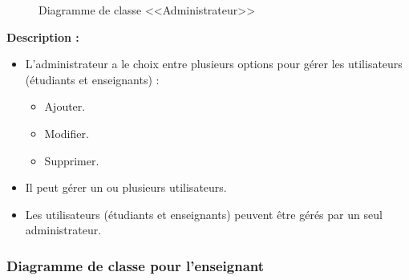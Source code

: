 \documentclass[12pt]{report}
\begin{document}
\begin{figure}[h]
\centering
    \centerline{}
    \caption{Diagramme de classe <<Administrateur>>}
\end{figure}

\vspace{0.3in}

\textbf{Description :}

\begin{itemize}
    \item L'administrateur a le choix entre plusieurs options pour gérer les utilisateurs (étudiants et enseignants) :
    \begin{itemize}
        \item Ajouter.
        \item Modifier.
        \item Supprimer.
    \end{itemize}
    \item Il peut gérer un ou plusieurs utilisateurs.
    \item Les utilisateurs (étudiants et enseignants) peuvent être gérés par un seul administrateur.
\end{itemize}

\newpage

\subsubsection{Diagramme de classe pour l'enseignant}
\end{document}
